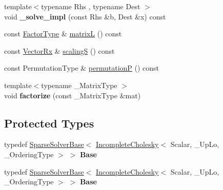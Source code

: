 \begin{DoxyCompactItemize}
{\footnotesize template$<$typename Rhs , typename Dest $>$ }\\void {\bfseries \+\_\+solve\+\_\+impl} (const Rhs \&b, Dest \&x) const
\item 
const \hyperlink{group___sparse_core___module}{Factor\+Type} \& \hyperlink{class_eigen_1_1_incomplete_cholesky_a7d1f1878505fd1862e6f2286d27ff09a}{matrixL} () const
\item 
const \hyperlink{group___core___module}{Vector\+Rx} \& \hyperlink{class_eigen_1_1_incomplete_cholesky_a30d66dd77147a84ec3302e7d5fe5d924}{scalingS} () const
\item 
const Permutation\+Type \& \hyperlink{class_eigen_1_1_incomplete_cholesky_a0d52cec5e17f485a362766363ba90b02}{permutationP} () const
\item 
\mbox{\label{class_eigen_1_1_incomplete_cholesky_a48ebb523471b42789e5c6d6e1492a9af}} 
{\footnotesize template$<$typename \+\_\+\+Matrix\+Type $>$ }\\void {\bfseries factorize} (const \+\_\+\+Matrix\+Type \&mat)
\end{DoxyCompactItemize}
\subsection*{Protected Types}
\begin{DoxyCompactItemize}
\item 
\mbox{\label{class_eigen_1_1_incomplete_cholesky_a954c3b3807af067ab2f2440e8cb3e751}} 
typedef \hyperlink{group___sparse_core___module_class_eigen_1_1_sparse_solver_base}{Sparse\+Solver\+Base}$<$ \hyperlink{class_eigen_1_1_incomplete_cholesky}{Incomplete\+Cholesky}$<$ Scalar, \+\_\+\+Up\+Lo, \+\_\+\+Ordering\+Type $>$ $>$ {\bfseries Base}
\item 
\mbox{\label{class_eigen_1_1_incomplete_cholesky_a954c3b3807af067ab2f2440e8cb3e751}} 
typedef \hyperlink{group___sparse_core___module_class_eigen_1_1_sparse_solver_base}{Sparse\+Solver\+Base}$<$ \hyperlink{class_eigen_1_1_incomplete_cholesky}{Incomplete\+Cholesky}$<$ Scalar, \+\_\+\+Up\+Lo, \+\_\+\+Ordering\+Type $>$ $>$ {\bfseries Base}
\end{DoxyCompactItemize}
